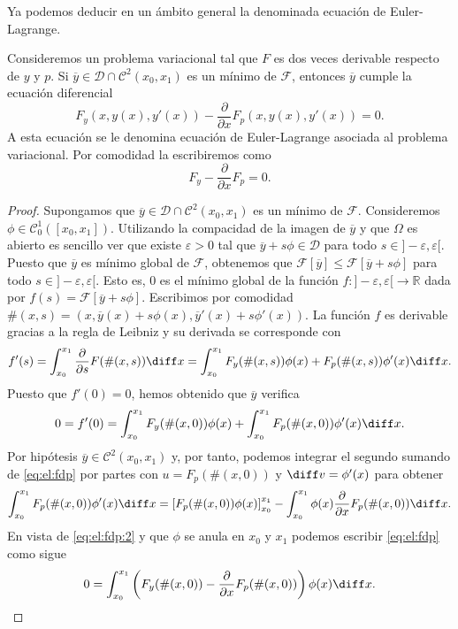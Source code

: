 \documentclass{article}
\begin{document}
Ya podemos deducir en un ámbito general la denominada ecuación de Euler-Lagrange.

\begin{thm} \label{thm:el} Consideremos un
  problema variacional tal que $F$ es dos veces derivable respecto de $y$ y $p$. Si
  $\overline{y} \in \mathcal{D} \cap \mathcal{C}^2(x_0, x_1)$ es un mínimo de $\mathcal{F}$,
  entonces $\overline{y}$ cumple la ecuación diferencial
  \[F_y(x, y(x), y'(x)) - \frac{\partial}{\partial x} F_p(x, y(x), y'(x)) = 0.\] A esta ecuación se
  le denomina ecuación de Euler-Lagrange asociada al problema variacional. Por comodidad la
  escribiremos como
  \[F_y - \frac{\partial}{\partial x} F_p = 0.\]
\end{thm}
\begin{proof}
  Supongamos que $\overline{y} \in \mathcal{D} \cap \mathcal{C}^2(x_0, x_1)$ es un mínimo de
  $\mathcal{F}$. Consideremos $\phi \in \mathcal{C}^1_0([x_0, x_1])$. Utilizando la compacidad de la
  imagen de $\overline{y}$ y que $\Omega$ es abierto es sencillo ver que existe $\varepsilon > 0$
  tal que $\overline{y} + s \phi \in \mathcal{D}$ para todo $s \in ]-\varepsilon,
  \varepsilon[$. Puesto que $\overline{y}$ es mínimo global de $\mathcal{F}$, obtenemos que
  $\mathcal{F}[\overline{y}] \le \mathcal{F}[\overline{y} + s \phi]$ para todo
  $s \in ]-\varepsilon, \varepsilon[$. Esto es, $0$ es el mínimo global de la función
  $f\colon ]-\varepsilon, \varepsilon[ \to \mathbb{R}$ dada por
  $f(s) = \mathcal{F}[\overline{y} + s \phi]$. Escribimos por comodidad
  $\#(x, s) = (x, \overline{y}(x) + s \phi(x), \overline{y}'(x) + s \phi'(x))$. La función $f$ es
  derivable gracias a la regla de Leibniz y su derivada se corresponde con
  \[f'(s) = \int_{x_0}^{x_1} \frac{\partial}{\partial s} F(\#(x, s)) \diff x = \int_{x_0}^{x_1}
    F_y(\#(x, s)) \phi(x) + F_p(\#(x, s)) \phi'(x) \diff x.\] Puesto que $f'(0) = 0$, hemos obtenido
  que $\overline{y}$ verifica
  \begin{equation} \label{eq:el:fdp} 0 = f'(0) = \int_{x_0}^{x_1} F_y(\#(x, 0)) \phi(x) +
    \int_{x_0}^{x_1} F_p(\#(x, 0)) \phi'(x) \diff x.
  \end{equation}
  Por hipótesis $\overline{y} \in \mathcal{C}^2(x_0, x_1)$ y, por tanto, podemos integrar el segundo
  sumando de \eqref{eq:el:fdp} por partes con $u = F_p(\#(x, 0))$ y $\diff v = \phi'(x)$ para
  obtener
  \begin{equation} \label{eq:el:fdp:2} \int_{x_0}^{x_1} F_p(\#(x, 0)) \phi'(x) \diff x = \left[F_p(\#(x, 0)) \phi(x)\right]_{x_0}^{x_1} -
    \int_{x_0}^{x_1} \phi(x) \frac{\partial}{\partial x} F_p(\#(x, 0)) \diff x.
  \end{equation}
  En vista de \eqref{eq:el:fdp:2} y que $\phi$ se anula en $x_0$ y $x_1$ podemos escribir
  \eqref{eq:el:fdp} como sigue
  \begin{equation} \label{eq:el:fd} 0 = \int_{x_0}^{x_1} \left(F_y(\#(x, 0)) -
      \frac{\partial}{\partial x} F_p(\#(x, 0))\right) \phi(x) \diff x.
  \end{equation}
  

\end{proof}
\end{document}

